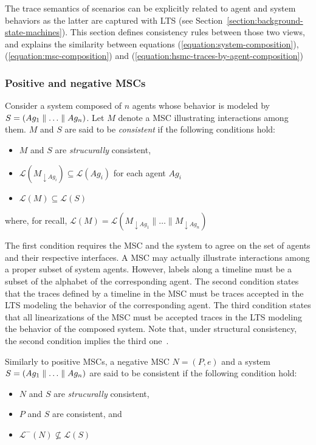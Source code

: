 The trace semantics of scenarios can be explicitly related to agent and system behaviors as the latter are captured with LTS (see Section~\ref{section:background-state-machines}). This section defines consistency rules between those two views, and explains the similarity between equations (\ref{equation:system-composition}), (\ref{equation:msc-composition}) and (\ref{equation:hsmc-traces-by-agent-composition})

\subsubsection*{Positive and negative MSCs}

Consider a system composed of $n$ agents whose behavior is modeled by $S = (Ag_1 \parallel \ldots \parallel Ag_n)$. Let $M$ denote a MSC illustrating interactions among them. $M$ and $S$ are said to be \emph{consistent} if the following conditions hold:

\begin{itemize}
\item $M$ and $S$ are \emph{strucurally} consistent,
\item $\mathcal{L}(M_{\downarrow Ag_i}) \subseteq \mathcal{L}(Ag_i)$ for each agent $Ag_i$
\item $\mathcal{L}(M) \subseteq \mathcal{L}(S)$
\end{itemize}

\noindent where, for recall, $\mathcal{L}(M) = \mathcal{L}(M_{\downarrow Ag_1} \parallel \ldots \parallel M_{\downarrow Ag_n})$

The first condition requires the MSC and the system to agree on the set of agents and their respective interfaces. A MSC may actually illustrate interactions among a proper subset of system agents. However, labels along a timeline must be a subset of the alphabet of the corresponding agent. The second condition states that the traces defined by a timeline in the MSC must be traces accepted in the LTS modeling the behavior of the corresponding agent.  The third condition states that all linearizations of the MSC must be accepted traces in the LTS modeling the behavior of the composed system. Note that, under structural consistency, the second condition implies the third one~\cite{Uchitel:2003}.

Similarly to positive MSCs, a negative MSC $N = (P,e)$ and a system $S = (Ag_1 \parallel \ldots \parallel Ag_n)$ are said to be consistent if the following condition hold:

\begin{itemize}
\item $N$ and $S$ are \emph{strucurally} consistent,
\item $P$ and $S$ are consistent, and
\item $\mathcal{L}^{-}(N) \not\subseteq \mathcal{L}(S)$
\end{itemize}

